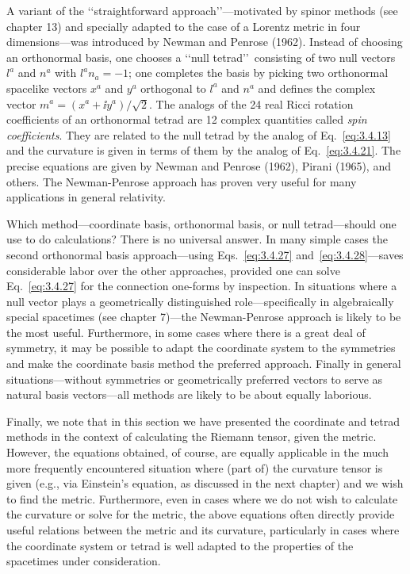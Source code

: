 A variant of the \lq\lq straightforward approach\rq\rq---motivated by spinor methods (see
chapter 13) and specially adapted to the case of a Lorentz metric in four
dimensions---was introduced by Newman and Penrose (1962). Instead of choosing
an orthonormal basis, one chooses a \lq\lq null tetrad\rq\rq\ consisting of two null vectors
$l^a$ and $n^a$ with $l^an_a=-1$; one completes the basis by picking two orthonormal
spacelike vectors $x^a$ and $y^a$ orthogonal to $l^a$ and $n^a$ and defines the complex vector
$m^a=(x^a+\ii y^a)/\sqrt{2}$. The analogs of the 24 real Ricci rotation coefficients of an
orthonormal tetrad are 12 complex quantities called \emph{spin coefficients}. They are
related to the null tetrad by the analog of Eq.~\eqref{eq:3.4.13} and the curvature is given
in terms of them by the analog of Eq.~\eqref{eq:3.4.21}. The precise equations are given
by Newman and Penrose (1962), Pirani (1965), and others. The Newman-Penrose
approach has proven very useful for many applications in general relativity.

Which method---coordinate basis, orthonormal basis, or null tetrad---should one
use to do calculations? There is no universal answer. In many simple cases the
second orthonormal basis approach---using Eqs.~\eqref{eq:3.4.27} and~\eqref{eq:3.4.28}---saves
considerable labor over the other approaches, provided one can solve Eq.~\eqref{eq:3.4.27}
for the connection one-forms by inspection. In situations where a null vector
plays a geometrically distinguished role---specifically in algebraically special spacetimes (see chapter 7)---the Newman-Penrose approach is likely to be the most useful.
Furthermore, in some cases where there is a great deal of symmetry, it may be
possible to adapt the coordinate system to the symmetries and make the coordinate
basis method the preferred approach. Finally in general situations---without symmetries or geometrically preferred vectors to serve as natural basis vectors---all
methods are likely to be about equally laborious.

Finally, we note that in this section we have presented the coordinate and tetrad
methods in the context of calculating the Riemann tensor, given the metric. However, the equations obtained, of course, are equally applicable in the much more
frequently encountered situation where (part of) the curvature tensor is given (e.g.,
via Einstein's equation, as discussed in the next chapter) and we wish to find the
metric. Furthermore, even in cases where we do not wish to calculate the curvature
or solve for the metric, the above equations often directly provide useful relations
between the metric and its curvature, particularly in cases where the coordinate
system or tetrad is well adapted to the properties of the spacetimes under consideration.
